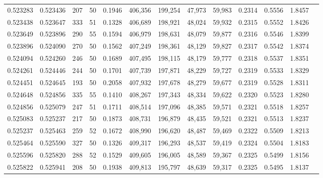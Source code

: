 \begin{tabular}{rrrrrrrrrrrrr}
0.523283 & 0.523436 &   207 &  50 &                                     0.1946 & 406,356 & 199,254 &  47,973 &  59,983 & 0.2314 & 0.5556 & 1.8457 \\
0.523438 & 0.523647 &   333 &  51 &                                     0.1328 & 406,689 & 198,921 &  48,024 &  59,932 & 0.2315 & 0.5552 & 1.8426 \\
0.523649 & 0.523896 &   290 &  55 &                                     0.1594 & 406,979 & 198,631 &  48,079 &  59,877 & 0.2316 & 0.5546 & 1.8399 \\
0.523896 & 0.524090 &   270 &  50 &                                     0.1562 & 407,249 & 198,361 &  48,129 &  59,827 & 0.2317 & 0.5542 & 1.8374 \\
0.524094 & 0.524260 &   246 &  50 &                                     0.1689 & 407,495 & 198,115 &  48,179 &  59,777 & 0.2318 & 0.5537 & 1.8351 \\
0.524261 & 0.524446 &   244 &  50 &                                     0.1701 & 407,739 & 197,871 &  48,229 &  59,727 & 0.2319 & 0.5533 & 1.8329 \\
0.524451 & 0.524645 &   193 &  50 &                                     0.2058 & 407,932 & 197,678 &  48,279 &  59,677 & 0.2319 & 0.5528 & 1.8311 \\
0.524648 & 0.524856 &   335 &  55 &                                     0.1410 & 408,267 & 197,343 &  48,334 &  59,622 & 0.2320 & 0.5523 & 1.8280 \\
0.524856 & 0.525079 &   247 &  51 &                                     0.1711 & 408,514 & 197,096 &  48,385 &  59,571 & 0.2321 & 0.5518 & 1.8257 \\
0.525083 & 0.525237 &   217 &  50 &                                     0.1873 & 408,731 & 196,879 &  48,435 &  59,521 & 0.2321 & 0.5513 & 1.8237 \\
0.525237 & 0.525463 &   259 &  52 &                                     0.1672 & 408,990 & 196,620 &  48,487 &  59,469 & 0.2322 & 0.5509 & 1.8213 \\
0.525464 & 0.525590 &   327 &  50 &                                     0.1326 & 409,317 & 196,293 &  48,537 &  59,419 & 0.2324 & 0.5504 & 1.8183 \\
0.525596 & 0.525820 &   288 &  52 &                                     0.1529 & 409,605 & 196,005 &  48,589 &  59,367 & 0.2325 & 0.5499 & 1.8156 \\
0.525822 & 0.525941 &   208 &  50 &                                     0.1938 & 409,813 & 195,797 &  48,639 &  59,317 & 0.2325 & 0.5495 & 1.8137 \\

\end{tabular}
